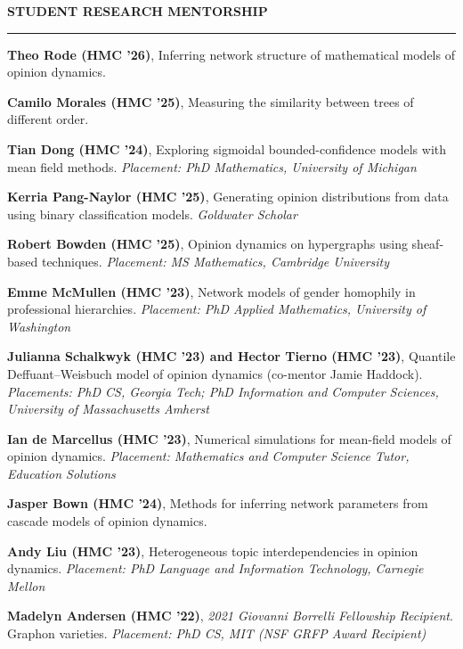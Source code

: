 \documentclass{resume} %
\renewenvironment{rSection}[1]{
\sectionskip
\textcolor{WinePurple}{\MakeUppercase{#1}}
\sectionlineskip
\hrule
\begin{list}{}{
\setlength{\leftmargin}{1.5em}
}
\item[]
}{
\end{list}
}
\begin{document}
\begin{rSection}{\bf Student Research Mentorship}

    \item \textbf{Theo Rode (HMC '26)}, Inferring network structure of mathematical models of opinion dynamics. 

    \item \textbf{Camilo Morales (HMC '25)}, Measuring the similarity between trees of different order.

    \item \textbf{Tian Dong (HMC '24)}, Exploring sigmoidal bounded-confidence models with mean field methods. {\em Placement: PhD Mathematics, University of Michigan}

    \item \textbf{Kerria Pang-Naylor (HMC '25)}, Generating opinion distributions from data using binary classification models. {\em Goldwater Scholar}

    \item \textbf{Robert Bowden (HMC '25)}, Opinion dynamics on hypergraphs using sheaf-based techniques.
    {\em Placement: MS Mathematics, Cambridge University}

    \item \textbf{Emme McMullen (HMC '23)}, Network models of gender homophily in professional hierarchies.
    {\em Placement: PhD Applied Mathematics, University of Washington}

    \item \textbf{Julianna Schalkwyk (HMC '23) and Hector Tierno (HMC '23)}, Quantile Deffuant–Weisbuch model of opinion dynamics (co-mentor Jamie Haddock).
    {\em Placements: PhD CS, Georgia Tech; PhD Information and Computer Sciences, University of Massachusetts Amherst}

    \item \textbf{Ian de Marcellus (HMC '23)}, Numerical simulations for mean-field models of opinion dynamics.
    {\em Placement: Mathematics and Computer Science Tutor, Education Solutions}

    \item \textbf{Jasper Bown (HMC '24)}, Methods for inferring network parameters from cascade models of opinion dynamics.

    \item \textbf{Andy Liu (HMC '23)}, Heterogeneous topic interdependencies in opinion dynamics.
    {\em Placement: PhD Language and Information Technology, Carnegie Mellon}

    \item \textbf{Madelyn Andersen (HMC '22)}, {\em 2021 Giovanni Borrelli Fellowship Recipient}. Graphon varieties.  
    {\em Placement: PhD CS, MIT (NSF GRFP Award Recipient)}


\end{rSection}
\end{document}
